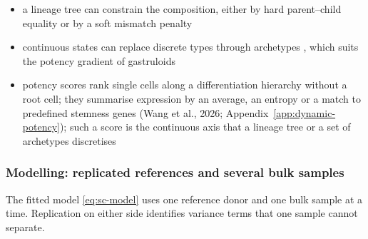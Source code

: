 \documentclass[pdflatex, sn-nature]{sn-jnl}
\theoremstyle{thmstyleone}%
\theoremstyle{thmstyletwo}%
\theoremstyle{thmstylethree}%
\begin{document}
\begin{itemize}
  \item a lineage tree can constrain the composition, either by hard parent--child equality
        \cite{wangBulkTissueCell2019,dongSCDCBulkGene2021,voelklHIDEHierarchicalCelltype2025,ederRectangleRobustScalable2026}
        or by a soft mismatch penalty \cite{huangAccurateEstimationRare2024}
  \item continuous states can replace discrete types through archetypes
        \cite{hartInferringBiologicalTasks2015,wangNonLinearArchetypalAnalysis2022}, which suits the potency
        gradient of gastruloids
  \item potency scores rank single cells along a differentiation hierarchy without a root cell; they summarise expression
        by an average, an entropy or a match to predefined stemness genes (Wang et al., 2026;
        Appendix~\ref{app:dynamic-potency}); such a score is the continuous axis that a lineage tree or a set of
        archetypes discretises
\end{itemize}

\subsubsection{Modelling: replicated references and several bulk samples}
\label{sec:generalized-linear-model}
\label{sec:mean-variance}

The fitted model \eqref{eq:sc-model} uses one reference donor and one bulk sample at a time. Replication on
either side identifies variance terms that one sample cannot separate.
\end{document}
